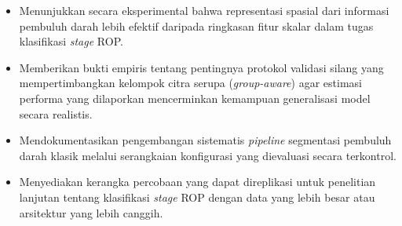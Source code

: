 \begin{itemize}
    \item Menunjukkan secara eksperimental bahwa representasi spasial dari informasi pembuluh
    darah lebih efektif daripada ringkasan fitur skalar dalam tugas klasifikasi \textit{stage}
    ROP.
    \item Memberikan bukti empiris tentang pentingnya protokol validasi silang yang
    mempertimbangkan kelompok citra serupa (\textit{group-aware}) agar estimasi performa
    yang dilaporkan mencerminkan kemampuan generalisasi model secara realistis.
    \item Mendokumentasikan pengembangan sistematis \textit{pipeline} segmentasi pembuluh
    darah klasik melalui serangkaian konfigurasi yang dievaluasi secara terkontrol.
    \item Menyediakan kerangka percobaan yang dapat direplikasi untuk penelitian lanjutan
    tentang klasifikasi \textit{stage} ROP dengan data yang lebih besar atau arsitektur yang
    lebih canggih.
\end{itemize}
